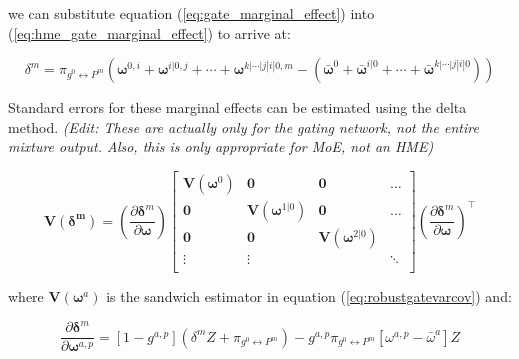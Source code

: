 \documentclass[12pt]{article}
\newcommand{\mean}[1]{\bar{#1}}
\newcommand{\gateprod}[2]{\pi_{#1 \longleftrightarrow #2}}
\begin{document}
we can substitute equation (\ref{eq:gate_marginal_effect}) into
(\ref{eq:hme_gate_marginal_effect}) to arrive at:

\begin{equation} \label{eq:marginal_effects}
  \delta^{m} = \gateprod{g^{0}}{P^{m}} \left(\boldsymbol{\omega}^{0, i} + \boldsymbol{\omega}^{i|0, j} + \cdots + \boldsymbol{\omega}^{k|\cdots|j|i|0, m} - \left( \mean{\boldsymbol{\omega}}^{0} + \mean{\boldsymbol{\omega}}^{i|0} + \cdots + \mean{\boldsymbol{\omega}}^{k|\cdots|j|i|0} \right) \right)
\end{equation}

\bigskip 

Standard errors for these marginal effects can be estimated using the
delta method. \textit{(Edit: These are actually only for the gating network, not
the entire mixture output. Also, this is only appropriate for MoE, not an
HME)}

\newcommand{\deltavar}{%
  \begin{bmatrix}
    \boldsymbol{V}(\boldsymbol{\omega}^{0}) & \boldsymbol{0}                            & \boldsymbol{0}                            & \dots  \\ 
    \boldsymbol{0}                          & \boldsymbol{V}(\boldsymbol{\omega}^{1|0}) & \boldsymbol{0}                            & \dots  \\
    \boldsymbol{0}                          & \boldsymbol{0}                            & \boldsymbol{V}(\boldsymbol{\omega}^{2|0}) &        \\
    \vdots                                  & \vdots                                    &                                           & \ddots \\
  \end{bmatrix}
}

\begin{equation}
    \boldsymbol{V}(\boldsymbol{\delta^{m}}) = \left(\frac{\partial \boldsymbol{\delta}^{m}}{\partial \boldsymbol{\omega}} \right) \deltavar  \left(\frac{\partial \boldsymbol{\delta}^{m}}{\partial \boldsymbol{\omega}} \right)^{\top}
\end{equation}

where $\boldsymbol{V}(\boldsymbol{\omega}^{a})$ is the sandwich estimator
in equation (\ref{eq:robustgatevarcov}) and:

\begin{equation}
  \frac{\partial \boldsymbol{\delta}^{m}}{\partial \boldsymbol{\omega}^{a,p}} = [1 - g^{a, p}] (\delta^{m} Z + \gateprod{g^{0}}{P^{m}}) - g^{a,p} \gateprod{g^{0}}{P^{m}} [\omega^{a,p} - \mean{\omega}^{a}] Z
\end{equation}
\end{document}
